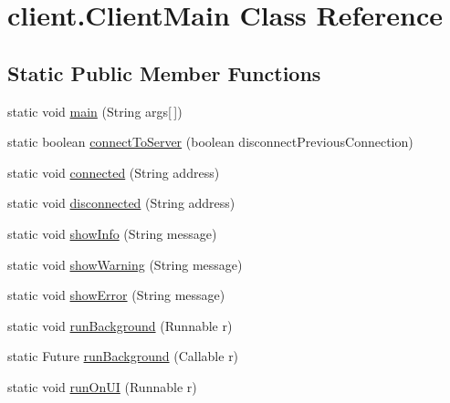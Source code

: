 \hypertarget{classclient_1_1_client_main}{}\section{client.\+Client\+Main Class Reference}
\label{classclient_1_1_client_main}
\subsection*{Static Public Member Functions}
\begin{DoxyCompactItemize}
\item 
static void \hyperlink{classclient_1_1_client_main_a1c318ff544d49e68acce0aeac5446336}{main} (String args\mbox{[}$\,$\mbox{]})
\item 
static boolean \hyperlink{classclient_1_1_client_main_aecd59c193bdb0536d649be78f72149b0}{connect\+To\+Server} (boolean disconnect\+Previous\+Connection)
\item 
static void \hyperlink{classclient_1_1_client_main_a37085a4271a663544855402f2892fb51}{connected} (String address)
\item 
static void \hyperlink{classclient_1_1_client_main_a824ffde5fd1b48d4a6ec25a9b00c3dc5}{disconnected} (String address)
\item 
static void \hyperlink{classclient_1_1_client_main_af975fd50f5fb1cc3ec29b65854b2a412}{show\+Info} (String message)
\item 
static void \hyperlink{classclient_1_1_client_main_a0964644423f3d533ca394456ee6f6c95}{show\+Warning} (String message)
\item 
static void \hyperlink{classclient_1_1_client_main_ab814569831a92249ded3d7258c0ac929}{show\+Error} (String message)
\item 
static void \hyperlink{classclient_1_1_client_main_afb84263c3e741a3f35611ef1b28b838e}{run\+Background} (Runnable r)
\item 
static Future \hyperlink{classclient_1_1_client_main_a0b66d467ed48a17869c86a90992937cc}{run\+Background} (Callable r)
\item 
static void \hyperlink{classclient_1_1_client_main_ad1c0bf16363beb967cc1a7a9a41a4e21}{run\+On\+UI} (Runnable r)
\end{DoxyCompactItemize}
